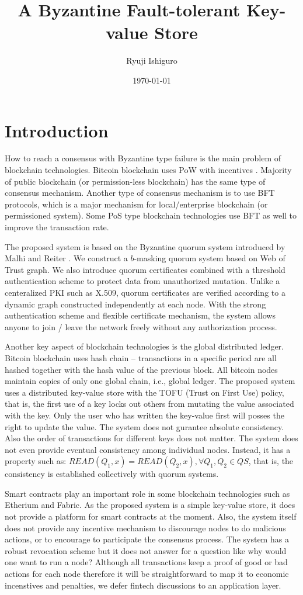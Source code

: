 \documentclass[twoside,twocolumn,10pt,fleqn]{article}
\title{A Byzantine Fault-tolerant Key-value Store}
\author{Ryuji Ishiguro}
\date{\today}
\begin{document}
\maketitle

\section{Introduction}
How to reach a consensus with Byzantine type failure is the main
problem of blockchain technologies. Bitcoin blockchain uses PoW with
incentives \cite{bitcoin}. Majority of public blockchain (or permission-less
blockchain) has the same type of consensus mechanism. Another type of
consensus mechanism is to use BFT protocols, which is a major
mechanism for local/enterprise blockchain (or permissioned
system). Some PoS type blockchain technologies use BFT as well to
improve the transaction rate.

The proposed system is based on the Byzantine quorum system introduced
by Malhi and Reiter \cite{Delhi:1}. We construct a $b$-masking quorum
system based on Web of Trust graph. We also introduce quorum certificates
combined with a threshold authentication scheme to protect data from
unauthorized mutation. Unlike a centeralized PKI such as X.509, quorum
certificates are verified according to a dynamic graph constructed
independently at each node. With the strong authentication scheme and
flexible certificate mechanism, the system allows anyone to join /
leave the network freely without any authorization process.

Another key aspect of blockchain technologies is the global
distributed ledger. Bitcoin blockchain uses hash chain -- transactions
in a specific period are all hashed together with the hash value of
the previous block. All bitcoin nodes maintain copies of only one
global chain, i.e., global ledger.
The proposed system uses a distributed key-value store with the TOFU
(Trust on First Use) policy, that is, the first use of a key locks out
others from mutating the value associated with the key. Only the
user who has written the key-value first will posses the right to
update the value. The system does not gurantee absolute
consistency. Also the order of transactions for different keys does not
matter. The system does not even provide eventual consistency among
individual nodes. Instead, it has a property such as: $READ(Q_1, x) =
READ(Q_2, x), \forall Q_1, Q_2 \in QS$, that is, the consistency is
established collectively with quorum systems.

Smart contracts play an important role in some blockchain technologies
such as Etherium and Fabric. As the proposed system is a simple
key-value store, it does not provide a platform for smart contracts at
the moment. Also, the system itself does not provide any incentive
mechanism to discourage nodes to do malicious actions, or to encourage
to participate the consensus process. The system has a robust
revocation scheme but it does not answer for a question like why would
one want to run a node? Although all transactions keep a proof of good
or bad actions for each node therefore it will be straightforward to
map it to economic incenstives and penalties, we defer fintech
discussions to an application layer.
\end{document}

